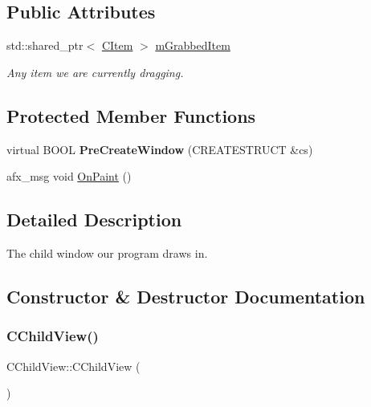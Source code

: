\subsection*{Public Attributes}
\begin{DoxyCompactItemize}
\item 
\mbox{\label{class_c_child_view_a5666495f6927ddc0636738dc02db8c3f}} 
std\+::shared\+\_\+ptr$<$ \mbox{\hyperlink{class_c_item}{C\+Item}} $>$ \mbox{\hyperlink{class_c_child_view_a5666495f6927ddc0636738dc02db8c3f}{m\+Grabbed\+Item}}
\begin{DoxyCompactList}\small\item\em Any item we are currently dragging. \end{DoxyCompactList}\end{DoxyCompactItemize}
\subsection*{Protected Member Functions}
\begin{DoxyCompactItemize}
\item 
\mbox{\label{class_c_child_view_a072cbcba60255377ac9d82aed9a14ce8}} 
virtual B\+O\+OL {\bfseries Pre\+Create\+Window} (C\+R\+E\+A\+T\+E\+S\+T\+R\+U\+CT \&cs)
\item 
afx\+\_\+msg void \mbox{\hyperlink{class_c_child_view_a8ea6d42631a4f9f446923ff864b239ab}{On\+Paint}} ()
\end{DoxyCompactItemize}


\subsection{Detailed Description}
The child window our program draws in. 

\subsection{Constructor \& Destructor Documentation}
\mbox{\label{class_c_child_view_aff5af7c162c10755edbe58f260ded6d4}} 
\subsubsection{\texorpdfstring{CChildView()}{CChildView()}}
{\footnotesize\ttfamily C\+Child\+View\+::\+C\+Child\+View (\begin{DoxyParamCaption}{ }\end{DoxyParamCaption})}

